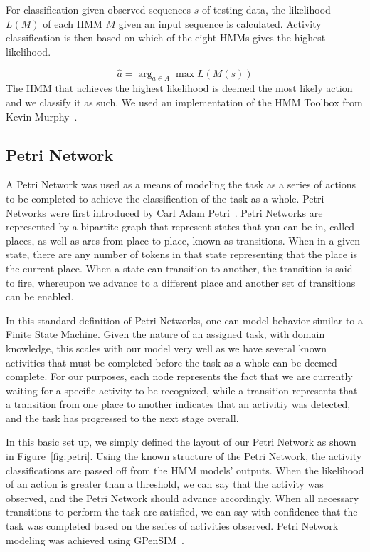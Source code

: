 \documentclass[10pt,twocolumn,letterpaper]{article}
\begin{document}
For classification given observed sequences $s$ of testing data, the likelihood $L(M)$ of each HMM $M$ given an input sequence is calculated. Activity classification is then based on which of the eight HMMs gives the highest likelihood.

\begin{equation}
\hat a = \arg_{a\in A}\max L(M(s))
\end{equation}
The HMM that achieves the highest likelihood is deemed the most likely action and we classify it as such. We used an implementation of the HMM Toolbox from Kevin Murphy~\cite{murphyHMM}.

\subsection{Petri Network}
A Petri Network was used as a means of modeling the task as a series of actions to be completed to achieve the classification of the task as a whole. Petri Networks were first introduced by Carl Adam Petri~\cite{petri1962kommunikation}. Petri Networks are represented by a bipartite graph that represent states that you can be in, called places, as well as arcs from place to place, known as transitions. When in a given state, there are any number of tokens in that state representing that the place is the current place. When a state can transition to another, the transition is said to fire, whereupon we advance to a different place and another set of transitions can be enabled. 

In this standard definition of Petri Networks, one can model behavior similar to a Finite State Machine. Given the nature of an assigned task, with domain knowledge, this scales with our model very well as we have several known activities that must be completed before the task as a whole can be deemed complete. For our purposes, each node represents the fact that we are currently waiting for a specific activity to be recognized, while a transition represents that a transition from one place to another indicates that an activitiy was detected, and the task has progressed to the next stage overall.

In this basic set up, we simply defined the layout of our Petri Network as shown in Figure~\ref{fig:petri}. Using the known structure of the Petri Network, the activity classifications are passed off from the HMM models' outputs. When the likelihood of an action is greater than a threshold, we can say that the activity was observed, and the Petri Network should advance accordingly. When all necessary transitions to perform the task are satisfied, we can say with confidence that the task was completed based on the series of activities observed. Petri Network modeling was achieved using GPenSIM~\cite{davidrajuh2010gpensim}.
\end{document}
